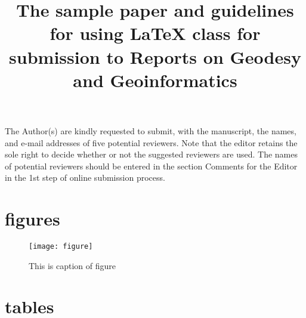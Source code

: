 \documentclass[review,startpage=111]{rog}
\begin{document}
    \title{The sample paper and guidelines for using \LaTeX{} class for submission to Reports on Geodesy and Geoinformatics}
    \maketitle
    The Author(s) are kindly requested to submit, with the manuscript, the names, and e-mail addresses of five potential reviewers. Note that the editor retains the sole right to decide whether or not the suggested reviewers are used. The names of potential reviewers should be entered in the section Comments for the Editor in the 1st step of online submission process.
    \cite{hw1997}

    \blindtext[10]

    
  \section{figures}
    \begin{figure}
      \texttt{[image: figure]}
      \caption{This is caption of figure}
    \end{figure}

  \section{tables}
\end{document}
